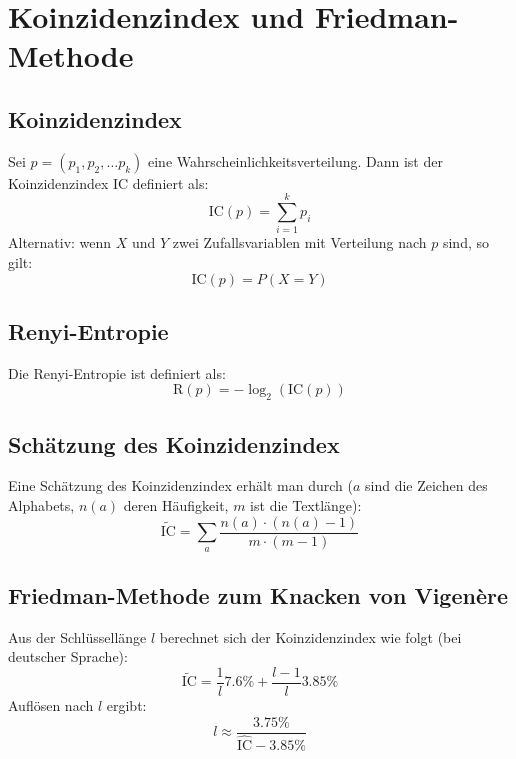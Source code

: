\chapter{Koinzidenzindex und Friedman-Methode}
\section{Koinzidenzindex}
Sei $p=(p_1, p_2, \ldots p_k)$ eine Wahrscheinlichkeitsverteilung. Dann ist
der Koinzidenzindex IC definiert als:
\begin{equation}
    \text{IC}(p) = \sum_{i=1}^k p_i 
\end{equation}
Alternativ: wenn $X$ und $Y$ zwei Zufallsvariablen mit Verteilung nach $p$ sind, so gilt:
\begin{equation}
    \text{IC}(p) = P(X=Y)
\end{equation}

\section{Renyi-Entropie}
Die Renyi-Entropie ist definiert als:
\begin{equation}
    \text{R}(p) = -\log_2(\text{IC}(p))
\end{equation}

\section{Schätzung des Koinzidenzindex}
Eine Schätzung des Koinzidenzindex erhält man durch ($a$ sind die Zeichen des Alphabets,
$n(a)$ deren Häufigkeit, $m$ ist die Textlänge):
\begin{equation}
    \tilde{\text{IC}} = \sum_a \frac{n(a) \cdot (n(a) - 1)}{m \cdot (m-1)}
\end{equation}

\section{Friedman-Methode zum Knacken von Vigenère}
Aus der Schlüssellänge $l$ berechnet sich der Koinzidenzindex wie folgt (bei deutscher Sprache):
\begin{equation}
    \tilde{\text{IC}} = \frac{1}{l} 7.6\% + \frac{l-1}{l} 3.85\%
\end{equation}
Auflösen nach $l$ ergibt:
\begin{equation}
    l \approx \frac{3.75\%}{\hat{\text{IC}} - 3.85\%}
\end{equation}
